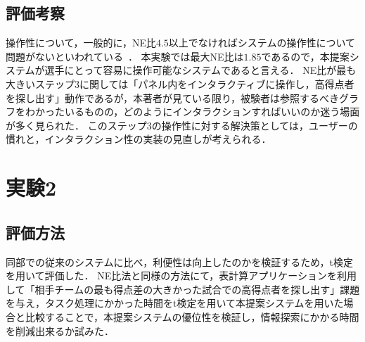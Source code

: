 \documentclass[sotsuron]{kuee}
\begin{document}
		\subsection{評価考察}
			操作性について，一般的に，NE比$4.5$以上でなければシステムの操作性について問題がないといわれている~\cite{NEMratio}．
			本実験では最大NE比は$1.85$であるので，本提案システムが選手にとって容易に操作可能なシステムであると言える．
			NE比が最も大きいステップ3に関しては「パネル内をインタラクティブに操作し，高得点者を探し出す」動作であるが，本著者が見ている限り，被験者は参照するべきグラフをわかったいるものの，どのようにインタラクションすればいいのか迷う場面が多く見られた．
			このステップ3の操作性に対する解決策としては，ユーザーの慣れと，インタラクション性の実装の見直しが考えられる．
	\section{実験2}
		\subsection{評価方法}
			同部での従来のシステムに比べ，利便性は向上したのかを検証するため，t検定を用いて評価した．
			NE比法と同様の方法にて，表計算アプリケーションを利用して「相手チームの最も得点差の大きかった試合での高得点者を探し出す」課題を与え，タスク処理にかかった時間をt検定を用いて本提案システムを用いた場合と比較することで，本提案システムの優位性を検証し，情報探索にかかる時間を削減出来るか試みた．
\end{document}
